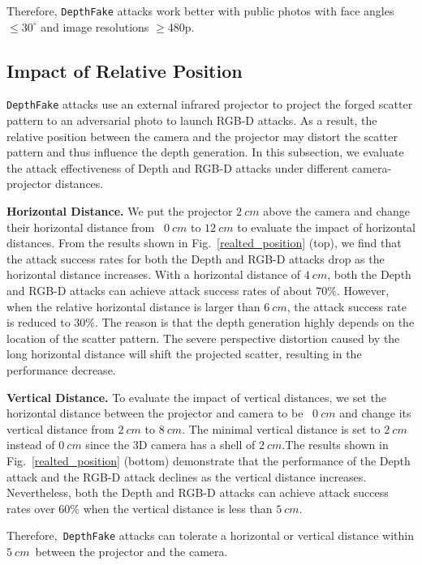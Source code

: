 Therefore, \texttt{DepthFake} attacks work better with  public photos with face angles $\leq 30^\circ$ and image resolutions $\geq$480p.


\subsection{Impact of Relative Position}

\texttt{DepthFake} attacks use an external infrared projector to project the forged scatter pattern to an adversarial photo to launch RGB-D attacks. As a result, the relative position between the camera and the projector may distort the scatter pattern and thus influence the depth generation. In this subsection, we evaluate the attack effectiveness of Depth and RGB-D attacks under different camera-projector distances.

\textbf{Horizontal Distance.} We put the projector $2~cm$ above the camera and change their horizontal distance from  $0~cm$ to $12~cm$ to evaluate the impact of horizontal distances. From the results shown in Fig.~\ref{realted_position} (top), we find that the attack success rates for both the Depth and RGB-D attacks drop as the horizontal distance increases. 
With a horizontal distance of $4~cm$, both the Depth  and RGB-D attacks can achieve attack success rates of about $70\%$. However, when the relative horizontal distance is larger than $6~cm$, the attack success rate is reduced to $30\%$. The reason is that the depth generation highly depends on the location of the scatter pattern. The severe perspective distortion caused by the long horizontal distance will shift the projected scatter, resulting in the performance decrease. 

\textbf{Vertical Distance.} To evaluate the impact of vertical distances, we set the horizontal distance between the projector and camera to be  $0~cm$ and change its vertical distance from $2~cm$ to $8~cm$. The minimal vertical distance is set to $2~cm$ instead of $0~cm$ since the 3D camera has a shell of $2~cm$.The results shown in Fig.~\ref{realted_position} (bottom) demonstrate that the performance of the Depth attack and the RGB-D attack declines as the vertical distance increases. Nevertheless, both the Depth and RGB-D attacks can achieve  attack success rates over  $60\%$ when the vertical distance is less than $5~cm$. 

Therefore, \texttt{DepthFake} attacks can tolerate a horizontal or vertical distance within $5~cm$ between the projector and the camera.



